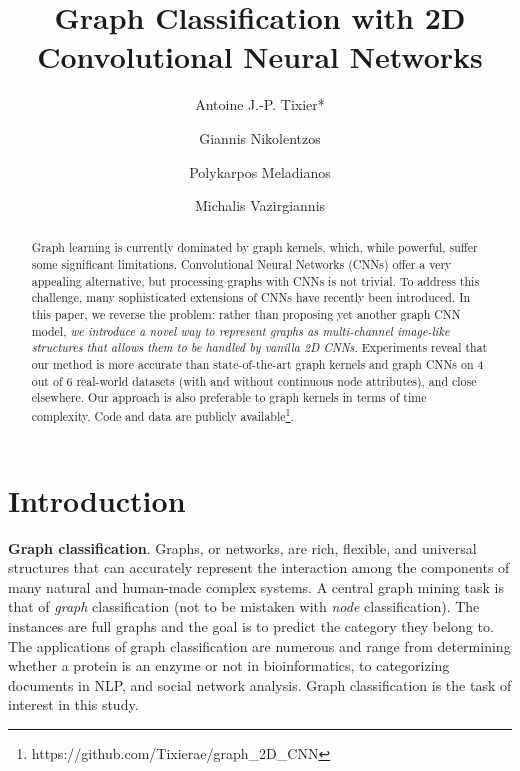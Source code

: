 \documentclass[runningheads]{llncs}
\begin{document}
\title{Graph Classification with 2D Convolutional Neural Networks}
\author{Antoine J.-P. Tixier* \and
Giannis Nikolentzos \and
Polykarpos Meladianos \and
Michalis Vazirgiannis}

\maketitle              \begin{abstract}
Graph learning is currently dominated by graph kernels, which, while powerful, suffer some significant limitations. Convolutional Neural Networks (CNNs) offer a very appealing alternative, but processing graphs with CNNs is not trivial. To address this challenge, many sophisticated extensions of CNNs have recently been introduced. In this paper, we reverse the problem: rather than proposing yet another graph CNN model, \textit{we introduce a novel way to represent graphs as multi-channel image-like structures that allows them to be handled by vanilla 2D CNNs}. 
Experiments reveal that our method is more accurate than state-of-the-art graph kernels and graph CNNs on 4 out of 6 real-world datasets (with and without continuous node attributes), and close elsewhere. Our approach is also preferable to graph kernels in terms of time complexity. Code and data are publicly available\footnote{\scriptsize{https://github.com/Tixierae/graph\_2D\_CNN}}.
\end{abstract} 

\section{Introduction}

\noindent \textbf{Graph classification}. 
Graphs, or networks, are rich, flexible, and universal structures that can accurately represent the interaction among the components of many natural and human-made complex systems. A central graph mining task is that of \textit{graph} classification (not to be mistaken with \textit{node} classification). The instances are full graphs and the goal is to predict the category they belong to. The applications of graph classification are numerous and range from determining whether a protein is an enzyme or not in bioinformatics, to categorizing documents in NLP, and social network analysis. Graph classification is the task of interest in this study.
\end{document}
